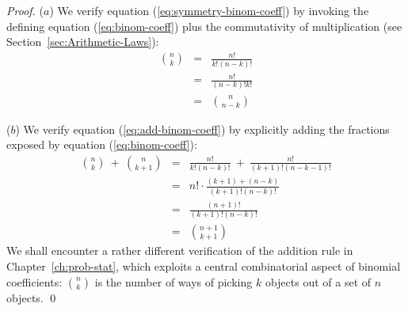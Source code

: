 \begin{proof}
($a$)
We verify equation (\ref{eq:symmetry-binom-coeff}) by invoking the
defining equation (\ref{eq:binom-coeff}) plus the commutativity of
multiplication (see Section~\ref{sec:Arithmetic-Laws}):
\begin{eqnarray*}
{n \choose k} & = & \frac{n!}{k!(n-k)!} \\
              & = & \frac{n!}{(n-k)!k!} \\
              & = & {n \choose {n-k}}
\end{eqnarray*}

\noindent ($b$)
We verify equation (\ref{eq:add-binom-coeff}) by explicitly adding the
fractions exposed by equation (\ref{eq:binom-coeff}):
\begin{eqnarray*}
{n \choose k} \ + \ {n \choose {k+1}}
  & = &
\frac{n!}{k!(n-k)!} \ + \ \frac{n!}{(k+1)!(n-k-1)!} \\
  & = &
n! \cdot \frac{(k+1) + (n-k)} {(k+1)!(n-k)!} \\
  & = & 
\frac{(n+1)!}{(k+1)!(n-k)!} \\
  & = &
{{n+1} \choose {k+1}}
\end{eqnarray*}
We shall encounter a rather different verification of the addition
rule in Chapter~\ref{ch:prob-stat}, which exploits a central combinatorial
aspect of binomial coefficients: $\displaystyle {n \choose k}$ is the
number of ways of picking $k$ objects out of a set of $n$ objects.
  \qed
\end{proof}

